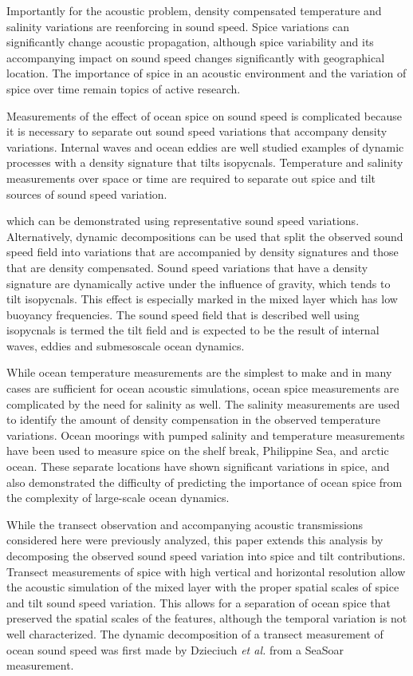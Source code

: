 \documentclass[preprint,NumberedRefs]{JASA}
\begin{document}
Importantly for the acoustic problem, density compensated temperature and salinity variations are reenforcing in sound speed. Spice variations can significantly change acoustic propagation, although spice variability and its accompanying impact on sound speed changes significantly with geographical location\citep{colosi12,colosi13,murat2021}. The importance of spice in an acoustic environment and the variation of spice over time remain topics of active research.

Measurements of the effect of ocean spice on sound speed is complicated because it is necessary to separate out sound speed variations that accompany density variations. Internal waves and ocean eddies are well studied examples of dynamic processes with a density signature that tilts isopycnals. Temperature and salinity measurements over space or time are required to separate out spice and tilt sources of sound speed variation.

which can be demonstrated using representative sound speed variations\citep{colosi21}. Alternatively, dynamic decompositions can be used that split the observed sound speed field into variations that are accompanied by density signatures and those that are density compensated\citep{dzieciuch2004}. Sound speed variations that have a density signature are dynamically active under the influence of gravity, which tends to tilt isopycnals. This effect is especially marked in the mixed layer which has low buoyancy frequencies. The sound speed field that is described well using isopycnals is termed the tilt field and is expected to be the result of internal waves, eddies and submesoscale ocean dynamics.

While ocean temperature measurements are the simplest to make and in many cases are sufficient for ocean acoustic simulations, ocean spice measurements are complicated by the need for salinity as well. The salinity measurements are used to identify the amount of density compensation in the observed temperature variations. Ocean moorings with pumped salinity and temperature measurements have been used to measure spice on the shelf break, Philippine Sea, and arctic ocean. These separate locations have shown significant variations in spice, and also demonstrated the difficulty of predicting the importance of ocean spice from the complexity of large-scale ocean dynamics.

While the transect observation and accompanying acoustic transmissions considered here were previously analyzed\citep{colosi2020observations}, this paper extends this analysis by decomposing the observed sound speed variation into spice and tilt contributions. Transect measurements of spice with high vertical and horizontal resolution allow the acoustic simulation of the mixed layer with the proper spatial scales of spice and tilt sound speed variation. This allows for a separation of ocean spice that preserved the spatial scales of the features, although the temporal variation is not well characterized. The dynamic decomposition of a transect measurement of ocean sound speed was first made by Dzieciuch \emph{et al.}\citep{dzieciuch2004} from a SeaSoar measurement.
\end{document}
